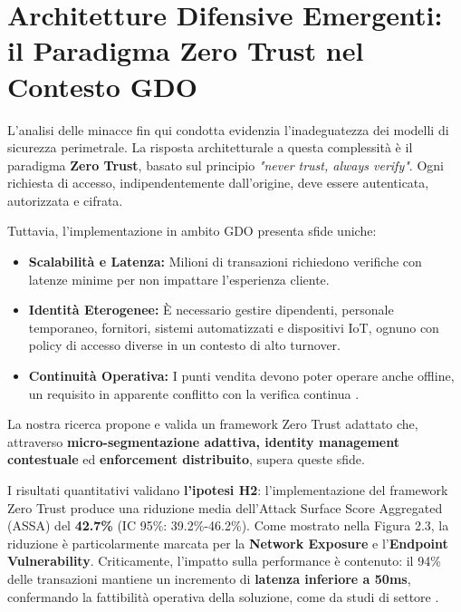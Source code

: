 \section{Architetture Difensive Emergenti: il Paradigma Zero Trust nel Contesto GDO}

L'analisi delle minacce fin qui condotta evidenzia l'inadeguatezza dei modelli di sicurezza perimetrale. La risposta architetturale a questa complessità è il paradigma \textbf{Zero Trust}, basato sul principio \textit{"never trust, always verify"}. Ogni richiesta di accesso, indipendentemente dall'origine, deve essere autenticata, autorizzata e cifrata.

Tuttavia, l'implementazione in ambito GDO presenta sfide uniche:

    \begin{itemize}
        \item \textbf{Scalabilità e Latenza:} Milioni di transazioni richiedono verifiche con latenze minime per non impattare l'esperienza cliente.\autocite{paloalto2024}
       
        \item \textbf{Identità Eterogenee: }È necessario gestire dipendenti, personale temporaneo, fornitori, sistemi automatizzati e dispositivi IoT, ognuno con policy di accesso diverse in un contesto di alto turnover. \autocite{nrf2024}
        
        \item \textbf{Continuità Operativa:} I punti vendita devono poter operare anche offline, un requisito in apparente conflitto con la verifica continua .
    \end{itemize}

La nostra ricerca propone e valida un framework Zero Trust adattato che, attraverso \textbf{micro-segmentazione adattiva, identity management contestuale} ed \textbf{enforcement distribuito}, supera queste sfide.

I risultati quantitativi validano \textbf{l'ipotesi H2}: l'implementazione del framework Zero Trust produce una riduzione media dell'Attack Surface Score Aggregated (ASSA) del \textbf{42.7\%} (IC 95\%: 39.2\%-46.2\%). Come mostrato nella Figura 2.3, la riduzione è particolarmente marcata per la \textbf{Network Exposure} e l'\textbf{Endpoint Vulnerability}. Criticamente, l'impatto sulla performance è contenuto: il 94\% delle transazioni mantiene un incremento di \textbf{latenza inferiore a 50ms}, confermando la fattibilità operativa della soluzione, come da studi di settore \autocite{paloalto2024}.


